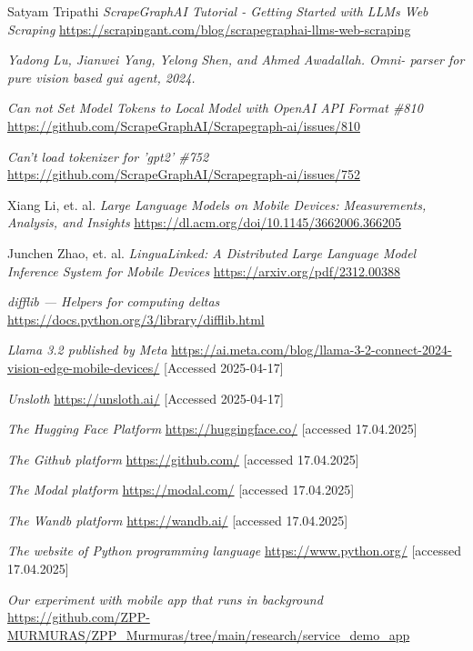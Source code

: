 \documentclass[licencjacka,en]{pracamgr}
\begin{document}
Satyam Tripathi
\textit{ScrapeGraphAI Tutorial - Getting Started with LLMs Web Scraping}
\url{https://scrapingant.com/blog/scrapegraphai-llms-web-scraping}

\textit{Yadong Lu, Jianwei Yang, Yelong Shen, and Ahmed Awadallah. Omni-
parser for pure vision based gui agent, 2024.}

\textit{Can not Set Model Tokens to Local Model with OpenAI API Format \#810}
\url{https://github.com/ScrapeGraphAI/Scrapegraph-ai/issues/810}

\textit{Can't load tokenizer for 'gpt2' \#752}
\url{https://github.com/ScrapeGraphAI/Scrapegraph-ai/issues/752}

Xiang Li, et. al.
\textit{Large Language Models on Mobile Devices: Measurements, Analysis, and Insights}
\url{https://dl.acm.org/doi/10.1145/3662006.366205}

Junchen Zhao, et. al.
\textit{LinguaLinked: A Distributed Large Language Model Inference System for Mobile Devices}
\url{https://arxiv.org/pdf/2312.00388}

\textit{difflib — Helpers for computing deltas}
\url{https://docs.python.org/3/library/difflib.html}

\textit{Llama 3.2 published by Meta}
\url{https://ai.meta.com/blog/llama-3-2-connect-2024-vision-edge-mobile-devices/}
[Accessed 2025-04-17]

\textit{Unsloth}
\url{https://unsloth.ai/}
[Accessed 2025-04-17]

\textit{The Hugging Face Platform}
\url{https://huggingface.co/}
[accessed 17.04.2025]

\textit{The Github platform}
\url{https://github.com/}
[accessed 17.04.2025]

\textit{The Modal platform}
\url{https://modal.com/}
[accessed 17.04.2025]

\textit{The Wandb platform}
\url{https://wandb.ai/}
[accessed 17.04.2025]

\textit{The website of Python programming language}
\url{https://www.python.org/}
[accessed 17.04.2025]

\textit{Our experiment with mobile app that runs in background}
\url{https://github.com/ZPP-MURMURAS/ZPP_Murmuras/tree/main/research/service_demo_app}
\end{document}
